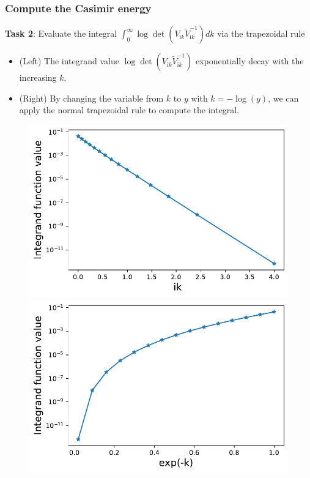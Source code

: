 \documentclass[dvipsnames,10pt]{beamer}
\begin{document}
\begin{frame}
    \frametitle{Compute the Casimir energy}
    \textbf{Task 2}: Evaluate the integral $\int_{0}^{\infty}\log\det\left(V_{\mathrm{i}k}\tilde{V}_{\mathrm{i}k}^{-1}\right)dk$ via the trapezoidal rule
    
    \begin{itemize}
        \item (Left) The integrand value $\log\det\left(V_{\mathrm{i}k}\tilde{V}_{\mathrm{i}k}^{-1}\right)$ exponentially decay with the increasing $k$.
        \item (Right) By changing the variable from $k$ to $y$ with $k = -\log(y)$, we can apply the normal trapezoidal rule to compute the integral.
    \end{itemize}
    
\begin{figure}[H]
    \begin{minipage}[b]{.47\textwidth}
    \centering
    \includegraphics[width=1\textwidth]{figs/integ_exp_decay.pdf}
    \end{minipage}
    \hfill
    \begin{minipage}[b]{.47\textwidth}
    \centering
    \includegraphics[width=1\textwidth]{figs/integ_exp_not_decay.pdf}
    \end{minipage}
    \end{figure}


\end{frame}
\end{document}
